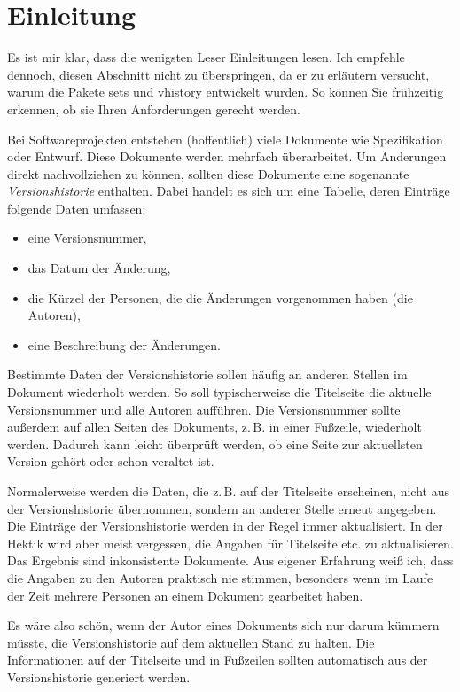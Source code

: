 \section{Einleitung}\label{einleitung}
Es ist mir klar, dass die wenigsten Leser Einleitungen lesen. Ich empfehle dennoch, diesen Abschnitt nicht zu überspringen, da er zu erläutern versucht, wa\-rum die Pakete sets und vhistory entwickelt wurden. So können Sie frühzeitig erkennen, ob sie Ihren Anforderungen gerecht werden.

Bei Softwareprojekten entstehen (hoffentlich) viele Dokumente wie Spezifikation oder Entwurf. Diese Dokumente werden mehrfach überarbeitet. Um Änderungen direkt nachvollziehen zu können, sollten diese Dokumente eine sogenannte \emph{Versionshistorie} enthalten. Dabei handelt es sich um eine Tabelle, deren Einträge folgende Daten umfassen:
\begin{itemize}
	\item eine Versionsnummer,
	\item das Datum der Änderung,
	\item die Kürzel der Personen, die die Änderungen vorgenommen haben (die Autoren),
	\item eine Beschreibung der Änderungen.
\end{itemize}

Bestimmte Daten der Versionshistorie sollen häufig an anderen Stellen im Dokument wiederholt werden. So soll typischerweise die Titelseite die aktuelle Versionsnummer und alle Autoren aufführen. Die Versionsnummer sollte außerdem auf allen Seiten des Dokuments, z.\,B. in einer Fußzeile, wiederholt werden. Dadurch kann leicht überprüft werden, ob eine Seite zur aktuellsten Version gehört oder schon veraltet ist.

Normalerweise werden die Daten, die z.\,B. auf der Titelseite erscheinen, nicht aus der Versionshistorie übernommen, sondern an anderer Stelle erneut angegeben. Die Einträge der Versionshistorie werden in der Regel immer aktualisiert. In der Hektik wird aber meist vergessen, die Angaben für Titelseite etc. zu aktualisieren. Das Ergebnis sind inkonsistente Dokumente. Aus eigener Erfahrung weiß ich, dass die Angaben zu den Autoren praktisch nie stimmen, besonders wenn im Laufe der Zeit mehrere Personen an einem Dokument gearbeitet haben.

Es wäre also schön, wenn der Autor eines Dokuments sich nur darum kümmern müsste, die Versionshistorie auf dem aktuellen Stand zu halten. Die Informationen auf der Titelseite und in Fußzeilen sollten automatisch aus der Versionshistorie generiert werden.

